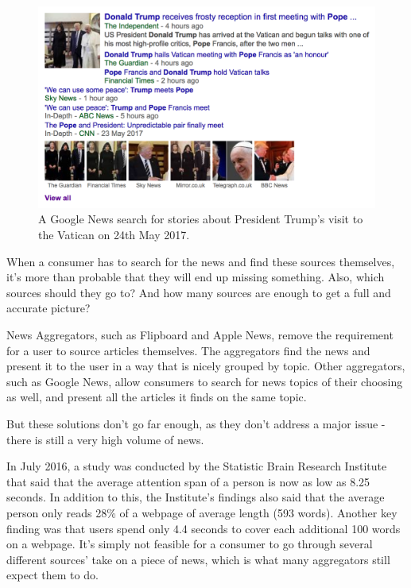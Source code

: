 \documentclass[12pt]{article}
\begin{document}
\begin{figure}[h]
  \centering
    \includegraphics[width=\textwidth]{DonaldTrumpPope.png}
   \caption[A Google News Search on 24th May 2017]{A Google News search for stories about President Trump's visit to the Vatican on 24th May 2017.}
   \label{DonaldTrumpPope}
\end{figure}

When a consumer has to search for the news and find these sources themselves, it's more than probable that they will end up missing something. Also, which sources should they go to? And how many sources are enough to get a full and accurate picture? 

News Aggregators, such as Flipboard and Apple News, remove the requirement for a user to source articles themselves. The aggregators find the news and present it to the user in a way that is nicely grouped by topic. Other aggregators, such as Google News, allow consumers to search for news topics of their choosing as well, and present all the articles it finds on the same topic.

But these solutions don't go far enough, as they don't address a major issue - there is still a very high volume of news.

In July 2016, a study was conducted by the Statistic Brain Research Institute that said that the average attention span of a person is now as low as 8.25 seconds. In addition to this, the Institute's findings also said that the average person only reads 28\% of a webpage of average length (593 words). Another key finding was that users spend only 4.4 seconds to cover each additional 100 words on a webpage. It's simply not feasible for a consumer to go through several different sources' take on a piece of news, which is what many aggregators still expect them to do.
\end{document}

